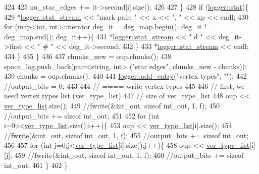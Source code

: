 \begin{DoxyCode}
424 
425       nu\_star\_edges += it->second[i].size();
426       
427     \}
428     \textcolor{keywordflow}{if} (\hyperlink{classlogger_a26812b5ba03f130e8dae3446d5fc032f}{logger::stat})\{
429       *\hyperlink{classlogger_a7db37821f875f2ba3540980b355779f5}{logger::stat\_stream} << \textcolor{stringliteral}{"mark pair: "} <<  x << \textcolor{stringliteral}{", "} << xp << endl;
430       \textcolor{keywordflow}{for} (map<int, int>::iterator deg\_it = deg\_map.begin(); deg\_it != deg\_map.end(); deg\_it++)\{
431         *\hyperlink{classlogger_a7db37821f875f2ba3540980b355779f5}{logger::stat\_stream} << \textcolor{stringliteral}{" d "} << deg\_it->first << \textcolor{stringliteral}{" # "} << deg\_it->second;
432       \}
433       *\hyperlink{classlogger_a7db37821f875f2ba3540980b355779f5}{logger::stat\_stream} << endl;
434     \}
435   \}
436   
437   chunks\_new = oup.chunks();
438   space\_log.push\_back(pair<string, int> (\textcolor{stringliteral}{"star edges"}, chunks\_new - chunks));
439   chunks = oup.chunks();
440 
441   \hyperlink{classlogger_a710163deb17bc81f70d53d285b8ac9ac}{logger::add\_entry}(\textcolor{stringliteral}{"vertex types"}, \textcolor{stringliteral}{""});
442   \textcolor{comment}{//output\_bits = 0;}
443   
444   \textcolor{comment}{// ==== write vertex types}
445 
446   \textcolor{comment}{// first, we need vertex types list (ver\_type\_list)}
447   \textcolor{comment}{// size of ver\_type\_list}
448   oup <<  \hyperlink{classmarked__graph__compressed_af2e3e55223d436628a02758dfae88493}{ver\_type\_list}.size();
449   \textcolor{comment}{//fwrite(&int\_out, sizeof int\_out, 1, f);}
450   \textcolor{comment}{//output\_bits += sizeof int\_out;}
451 
452   \textcolor{keywordflow}{for} (\textcolor{keywordtype}{int} i=0;i<\hyperlink{classmarked__graph__compressed_af2e3e55223d436628a02758dfae88493}{ver\_type\_list}.size();i++)\{
453     oup << \hyperlink{classmarked__graph__compressed_af2e3e55223d436628a02758dfae88493}{ver\_type\_list}[i].size();
454     \textcolor{comment}{//fwrite(&int\_out, sizeof int\_out, 1, f);}
455     \textcolor{comment}{//output\_bits += sizeof int\_out;}
456 
457     \textcolor{keywordflow}{for} (\textcolor{keywordtype}{int} j=0;j<\hyperlink{classmarked__graph__compressed_af2e3e55223d436628a02758dfae88493}{ver\_type\_list}[i].size();j++)\{
458       oup << \hyperlink{classmarked__graph__compressed_af2e3e55223d436628a02758dfae88493}{ver\_type\_list}[i][j];
459       \textcolor{comment}{//fwrite(&int\_out, sizeof int\_out, 1, f);}
460       \textcolor{comment}{//output\_bits += sizeof int\_out;}
461     \}
462   \}

\end{DoxyCode}
